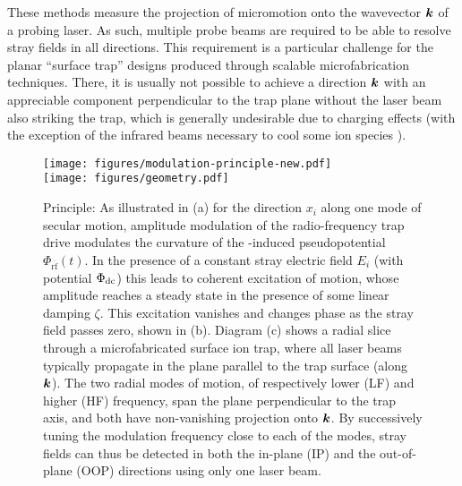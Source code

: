 \documentclass[pra,twocolumn]{revtex4-2}
\begin{document}
These methods measure the projection of micromotion onto the wavevector $\boldsymbol{k}{}$ of a probing laser.
As such, multiple probe beams are required to be able to resolve stray fields in all directions.
This requirement is a particular challenge for the planar \enquote{surface trap} designs produced through scalable microfabrication techniques.
There, it is usually not possible to achieve a direction $\boldsymbol{k}{}$ with an appreciable component perpendicular to the trap plane without the laser beam also striking the trap, which is generally undesirable due to charging effects (with the exception of the infrared beams necessary to cool some ion species \cite{allcockImplementationSymmetricSurfaceelectrode2010}).

\begin{figure}
	\texttt{[image: figures/modulation-principle-new.pdf]}\\\hspace{12pt}
	\texttt{[image: figures/geometry.pdf]}
	\caption{
		Principle: As illustrated in (a) for the direction $x_i$ along one mode of secular motion, amplitude modulation of the radio-frequency trap drive modulates the curvature of the \RF{}-induced pseudopotential $\Phi_{\overline{\mathrm{rf}}}(t)$.
		In the presence of a constant stray electric field $E_i$ (with potential $\Phi_{\textrm{dc}}$) this leads to coherent excitation of motion, whose amplitude reaches a steady state in the presence of some linear damping $\zeta$.
		This excitation vanishes and changes phase as the stray field passes zero, shown in (b).
		Diagram (c) shows a radial slice through a microfabricated surface ion trap, where all laser beams typically propagate in the plane parallel to the trap surface (along~$\boldsymbol{k}$).
		The two radial modes of motion, of respectively lower (LF) and higher (HF) frequency, span the plane perpendicular to the trap axis, and both have non-vanishing projection onto $\boldsymbol{k}$.
		By successively tuning the modulation frequency close to each of the modes, stray fields can thus be detected in both the in-plane (IP) and the out-of-plane (OOP) directions using only one laser beam.
	}
	\label{fig:principle}
\end{figure}
\end{document}
